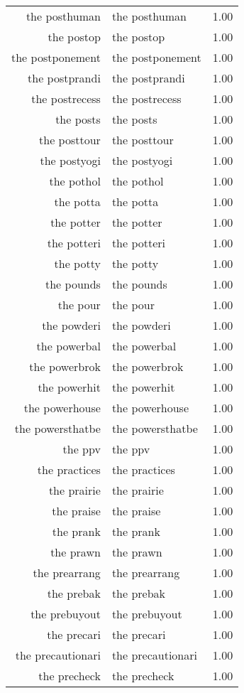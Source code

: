 \begin{table}[ht]
\begin{tabular}{rlr}
  the posthuman & the posthuman & 1.00 \\ 
  the postop & the postop & 1.00 \\ 
  the postponement & the postponement & 1.00 \\ 
  the postprandi & the postprandi & 1.00 \\ 
  the postrecess & the postrecess & 1.00 \\ 
  the posts & the posts & 1.00 \\ 
  the posttour & the posttour & 1.00 \\ 
  the postyogi & the postyogi & 1.00 \\ 
  the pothol & the pothol & 1.00 \\ 
  the potta & the potta & 1.00 \\ 
  the potter & the potter & 1.00 \\ 
  the potteri & the potteri & 1.00 \\ 
  the potty & the potty & 1.00 \\ 
  the pounds & the pounds & 1.00 \\ 
  the pour & the pour & 1.00 \\ 
  the powderi & the powderi & 1.00 \\ 
  the powerbal & the powerbal & 1.00 \\ 
  the powerbrok & the powerbrok & 1.00 \\ 
  the powerhit & the powerhit & 1.00 \\ 
  the powerhouse & the powerhouse & 1.00 \\ 
  the powersthatbe & the powersthatbe & 1.00 \\ 
  the ppv & the ppv & 1.00 \\ 
  the practices & the practices & 1.00 \\ 
  the prairie & the prairie & 1.00 \\ 
  the praise & the praise & 1.00 \\ 
  the prank & the prank & 1.00 \\ 
  the prawn & the prawn & 1.00 \\ 
  the prearrang & the prearrang & 1.00 \\ 
  the prebak & the prebak & 1.00 \\ 
  the prebuyout & the prebuyout & 1.00 \\ 
  the precari & the precari & 1.00 \\ 
  the precautionari & the precautionari & 1.00 \\ 
  the precheck & the precheck & 1.00 \\ 

\end{tabular}
\end{table}
